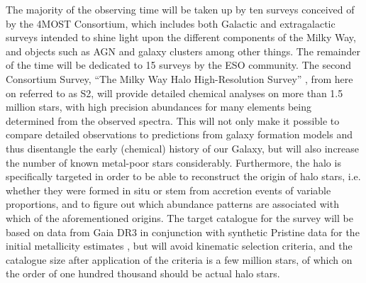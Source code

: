 \documentclass[a4paper,11pt]{article}
\begin{document}
The majority of the observing time will be taken up by ten surveys conceived of by the 4MOST Consortium, which includes both Galactic \citep{4mosts1,4mosts219,4mosts3,4mosts4,4mosts9} and extragalactic surveys \citep{4mosts5,4mosts6,4mosts7,4mosts8,4mosts10} intended to shine light upon the different components of the Milky Way, and objects such as AGN and galaxy clusters among other things. The remainder of the time will be dedicated to 15 surveys by the ESO community. The second Consortium Survey, ``The Milky Way Halo High-Resolution Survey'' \citep{4mosts219}, from here on referred to as S2, will provide detailed chemical analyses on more than 1.5 million stars, with high precision abundances for many elements being determined from the observed spectra. This will not only make it possible to compare detailed observations to predictions from galaxy formation models and thus disentangle the early (chemical) history of our Galaxy, but will also increase the number of known metal-poor stars considerably. Furthermore, the halo is specifically targeted in order to be able to reconstruct the origin of halo stars, i.e. whether they were formed in situ or stem from accretion events of variable proportions, and to figure out which abundance patterns are associated with which of the aforementioned origins. The target catalogue for the survey will be based on data from Gaia DR3 in conjunction with synthetic Pristine data for the initial metallicity estimates \citep[see Pristine survey,][]{pristinegaia,pristine}, but will avoid kinematic selection criteria, and the catalogue size after application of the criteria is a few million stars, of which on the order of one hundred thousand should be actual halo stars.
%
\end{document}
